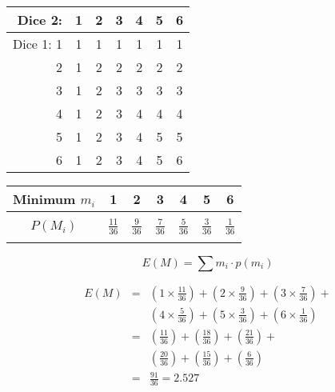 \documentclass[a4paper,12pt]{article}
\begin{document}
\begin{center}		
\begin{tabular}{|r||c|c|c|c|c|c|}
\hline
Dice 2: & \phantom{spa}1 \phantom{spa} & 2 & 3 & 4 & 5 & 6 \\ \hline  \hline
Dice 1: 1 & \phantom{spa}1 \phantom{spa} & \phantom{spa}1 \phantom{spa} & \phantom{spa}1 \phantom{spa} & \phantom{spa}1 \phantom{spa} & \phantom{spa}1 \phantom{spa} & \phantom{spa}1 \phantom{spa} \\  \hline
2 & \phantom{spa}1 \phantom{spa} & 2 & 2 & 2 & 2 & 2 \\  \hline
3 & \phantom{spa}1 \phantom{spa} & 2 & 3 & 3 & 3 & 3 \\  \hline
4 & \phantom{spa}1 \phantom{spa} & 2 & 3 & 4 & 4 & 4 \\  \hline
5 & \phantom{spa}1 \phantom{spa} & 2 & 3 & 4 & 5 & 5 \\  \hline
6 & \phantom{spa}1 \phantom{spa} & 2 & 3 & 4 & 5 & 6 \\  \hline
\end{tabular}		
\end{center}		
		\newpage 
		\large 
\begin{center}		
\begin{tabular}{|c||c|c|c|c|c|c|}
\hline
Minimum $m_i$ & \phantom{sp}1 \phantom{sp}  &  \phantom{sp}  2 \phantom{sp}  &  \phantom{sp} 3 \phantom{sp}  &  \phantom{sp} 4 \phantom{sp}  &  \phantom{sp} 5 \phantom{sp}  &  \phantom{sp} 6  \phantom{sp} \\ \hline  \hline
&&&&&&\\
$P(M_i)$ & ${ \displaystyle \frac{11}{36} }$ & ${ \displaystyle \frac{9}{36} }$ & ${ \displaystyle \frac{7}{36} }$ & ${ \displaystyle \frac{5}{36} }$ & ${ \displaystyle \frac{3}{36} }$ & ${ \displaystyle \frac{1}{36} }$ \\ 
&&&&&&\\ \hline
\end{tabular}		
\end{center}

	\[ E(M) =  \sum  m_i \cdot p(m_i)   \]
	
	
	
	
	
	
	
	
	
	
	\begin{eqnarray*}
	E(M) &=& \left(1 \times \frac{11}{36}\right) + \left(2 \times \frac{9}{36}\right) + \left(3 \times \frac{7}{36}\right) + \\ 
& &	\left(4 \times \frac{5}{36}\right) + \left(5 \times \frac{3}{36}\right) + \left(6 \times \frac{1}{36}\right)\\
&=& \left( \frac{11}{36}\right) + \left( \frac{18}{36}\right) + \left( \frac{21}{36}\right) + \\ 
& &	\left(\frac{20}{36}\right) + \left(\frac{15}{36}\right) + \left( \frac{6}{36}\right)\\
	&=& \frac{91}{36} = \boldsymbol{2.527 }\end{eqnarray*}
\end{document}
